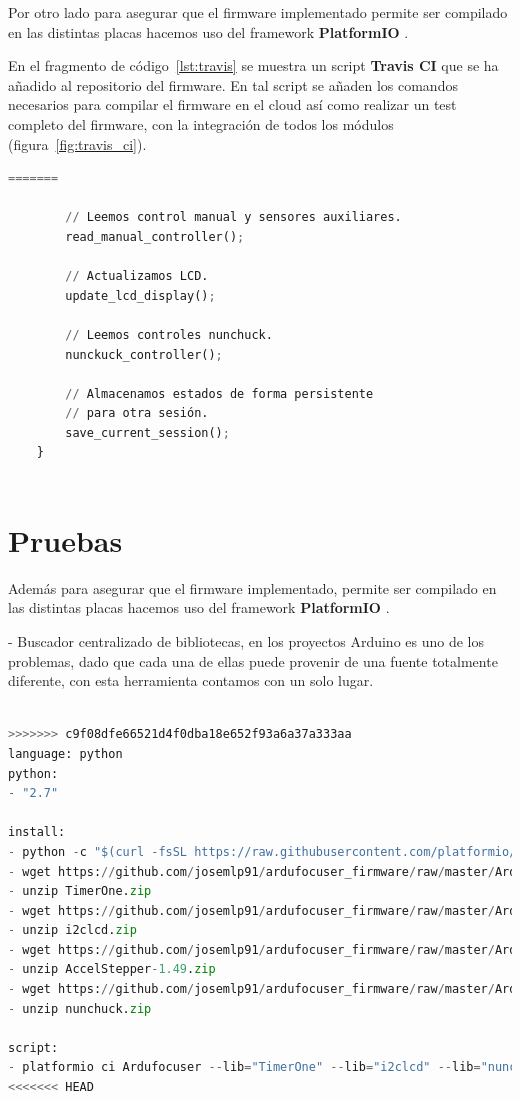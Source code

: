 Por otro lado para asegurar que el firmware implementado permite ser compilado en las distintas placas hacemos uso del framework   \textbf{PlatformIO} \cite{patform}.


En el fragmento de código~\ref{lst:travis} se muestra un script \textbf{Travis CI} que se ha añadido al repositorio del firmware. En tal script se añaden los comandos necesarios para compilar el firmware en el cloud así como realizar un test completo del firmware, con la integración de todos los módulos (figura~\ref{fig:travis_ci}).


 

\begin{lstlisting}[language=python, caption={Script travis para realizar integración continua},label={lst:travis}]
=======
		
		// Leemos control manual y sensores auxiliares.
		read_manual_controller();
		
		// Actualizamos LCD.
		update_lcd_display();
		
		// Leemos controles nunchuck.
		nunckuck_controller();
		
		// Almacenamos estados de forma persistente 
		// para otra sesión.
		save_current_session();
	}



\end{lstlisting}


\section{Pruebas}

Además para asegurar que el firmware implementado, permite ser compilado en las distintas placas hacemos uso del framework   \textbf{PlatformIO} \cite{patform}.


- Buscador centralizado de bibliotecas, en los proyectos Arduino es uno de los problemas, dado que cada una de ellas puede provenir de una fuente totalmente diferente, con esta herramienta contamos con un solo lugar.

\newpage
\begin{lstlisting}[language=python, caption={Script travis para realizar integración continua},label={lst:write_read_serial_port_sample}]

>>>>>>> c9f08dfe66521d4f0dba18e652f93a6a37a333aa
language: python
python:
- "2.7"

install:
- python -c "$(curl -fsSL https://raw.githubusercontent.com/platformio/platformio/master/scripts/get-platformio.py)"
- wget https://github.com/josemlp91/ardufocuser_firmware/raw/master/Ardufocuser/libs/TimerOne.zip
- unzip TimerOne.zip
- wget https://github.com/josemlp91/ardufocuser_firmware/raw/master/Ardufocuser/libs/i2clcd.zip
- unzip i2clcd.zip
- wget https://github.com/josemlp91/ardufocuser_firmware/raw/master/Ardufocuser/libs/AccelStepper-1.49.zip
- unzip AccelStepper-1.49.zip
- wget https://github.com/josemlp91/ardufocuser_firmware/raw/master/Ardufocuser/libs/nunchuck.zip
- unzip nunchuck.zip

script:
- platformio ci Ardufocuser --lib="TimerOne" --lib="i2clcd" --lib="nunchuck" --lib="AccelStepper" --board=uno
<<<<<<< HEAD
\end{lstlisting}


